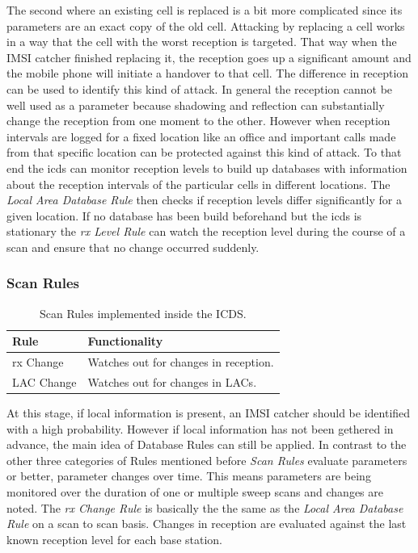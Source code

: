 The second where an existing cell is replaced is a bit more complicated since its parameters are an exact copy of the old cell.
Attacking by replacing a cell works in a way that the cell with the worst reception is targeted.
That way when the IMSI catcher finished replacing it, the reception goes up a significant amount and the mobile phone will initiate a handover to that cell.
The difference in reception can be used to identify this kind of attack.
In general the reception cannot be well used as a parameter because shadowing and reflection can substantially change the reception from one moment to the other.
However when reception intervals are logged for a fixed location like an office and important calls made from that specific location can be protected against this kind of attack.
To that end the \gls{icds} can monitor reception levels to build up databases with information about the reception intervals of the particular cells in different locations.
The \emph{Local Area Database Rule} then checks if reception levels differ significantly for a given location.
If no database has been build beforehand but the \gls{icds} is stationary the \emph{rx Level Rule} can watch the reception level during the course of a scan and ensure that no change occurred suddenly.

\subsubsection{Scan Rules}
\begin{table}
\centering
\begin{tabular}{ll}
\toprule
Rule					&Functionality\\
\midrule
rx Change		 		&Watches out for changes in reception.\\
LAC Change				&Watches out for changes in LACs.\\
\bottomrule
\end{tabular}
\caption{Scan Rules implemented inside the ICDS.}
\label{tab:scan_rules}
\end{table}
At this stage, if local information is present, an IMSI catcher should be identified with a high probability.
However if local information has not been gethered in advance, the main idea of Database Rules can still be applied.
In contrast to the other three categories of Rules mentioned before \emph{Scan Rules} evaluate parameters or better, parameter changes over time.
This means parameters are being monitored over the duration of one or multiple sweep scans and changes are noted.
The \emph{rx Change Rule} is basically the the same as the \emph{Local Area Database Rule} on a scan to scan basis.
Changes in reception are evaluated against the last known reception level for each base station.

